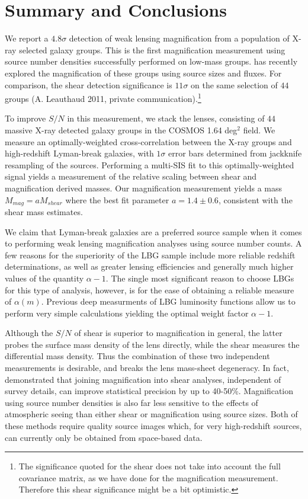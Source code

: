\section{Summary and Conclusions}
\label{summary}
We report a $4.8 \sigma$ detection of weak lensing magnification from a population of X-ray selected galaxy groups. This is the first magnification measurement using source number densities successfully performed on low-mass groups. \citet{Schmidt12} has recently explored the magnification of these groups using source sizes and fluxes.  For comparison, the shear detection significance is $11 \sigma$ on the same selection of $44$ groups (A. Leauthaud 2011, private communication).\footnote{The significance quoted for the shear does not take into account the full covariance matrix, as we have done for the magnification measurement.  Therefore this shear significance might be a bit optimistic.}

To improve $S/N$ in this measurement, we stack the lenses, consisting of $44$ massive X-ray detected galaxy groups in the COSMOS 1.64 deg$^2$ field.  We measure an optimally-weighted cross-correlation between the X-ray groups and high-redshift Lyman-break galaxies, with $1 \sigma$ error bars determined from jackknife resampling of the sources. Performing a multi-SIS fit to this optimally-weighted signal yields a measurement of the relative scaling between shear and magnification derived masses. Our magnification measurement yields a mass $M_{mag}=aM_{shear}$ where the best fit parameter $a=1.4 \pm 0.6$, consistent with the shear mass estimates.

We claim that Lyman-break galaxies are a preferred source sample when it comes to performing weak lensing magnification analyses using source number counts.  A few reasons for the superiority of the LBG sample include more reliable redshift determinations, as well as greater lensing efficiencies and generally much higher values of the quantity $\alpha-1$.  The single most significant reason to choose LBGs for this type of analysis, however, is for the ease of obtaining a reliable measure of $\alpha(m)$.  Previous deep measurments of LBG luminosity functions allow us to perform very simple calculations yielding the optimal weight factor $\alpha-1$.

Although the $S/N$ of shear is superior to magnification in general, the latter probes the surface mass density of the lens directly, while the shear measures the differential mass density.  Thus the combination of these two independent measurements is desirable, and breaks the lens mass-sheet degeneracy. In fact, \citet{RozoSchmidt10} demonstrated that joining magnification into shear analyses, independent of survey details, can improve statistical precision by up to 40-50\%. Magnification using source number densities is also far less sensitive to the effects of atmospheric seeing than either shear or magnification using source sizes.  Both of these methods require quality source images which, for very high-redshift sources, can currently only be obtained from space-based data.

